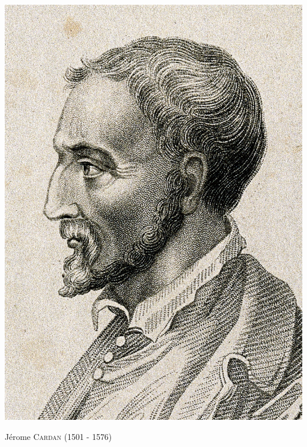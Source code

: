 \begin{marginfigure}[5cm]
    \centering
    \includegraphics[scale=0.8]{images/jerome_cardan.jpg}
    \caption*{\centering Jérome \textsc{Cardan} (1501 - 1576)}
\end{marginfigure}
